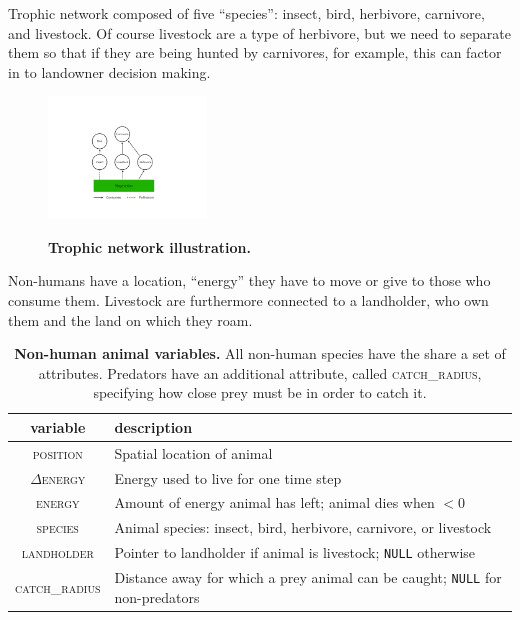 \documentclass{article}
\theoremstyle{mytheorem}
\theoremstyle{myremark}
\begin{document}
Trophic network composed of five ``species'': insect, bird, herbivore,
carnivore, and livestock. Of course livestock are a type of herbivore, but
we need to separate them so that if they are being hunted by carnivores,
for example, this can factor in to landowner decision making. 

\begin{figure}
  \caption{\textbf{Trophic network illustration.}}
  \centering
    \includegraphics[width=0.375\textwidth]{Figures/TrophicNetwork.pdf}
  \label{fig:TrophicNetwork}
\end{figure}

Non-humans
have a location, ``energy'' they have to move or give to those who consume
them. Livestock are furthermore connected to a landholder, who own them and
the land on which they roam.

\begin{table}[h]
  \caption{\textbf{Non-human animal variables.} All non-human species have
  the share a set of attributes. Predators have an additional attribute, called
\textsc{catch\_radius}, specifying how close prey must be in order to catch it.}

  \label{tab:nonhuman}
  \begin{tabular}{cl} \toprule
    variable & description \\ \midrule  
    \textsc{position} & Spatial location of animal \\
    $\Delta$\textsc{energy} & Energy used to live for one time step \\
    \textsc{energy} & Amount of energy animal has left; animal dies when $<0$ \\
    \textsc{species} & Animal species: insect, bird, herbivore, carnivore, or
    livestock \\
    \textsc{landholder} & Pointer to landholder if animal is livestock; \texttt{NULL}
    otherwise \\
    \textsc{catch\_radius} & Distance away for which a prey animal can be caught; \texttt{NULL} for non-predators  \\
    \bottomrule
  \end{tabular} 
\end{table}
\end{document}
